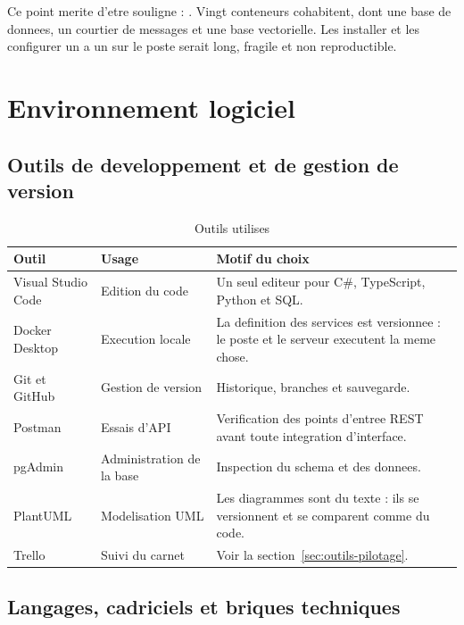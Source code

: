 Ce point merite d'etre souligne : . Vingt
conteneurs cohabitent, dont une base de donnees, un courtier de messages
et une base vectorielle. Les installer et les configurer un a un sur le
poste serait long, fragile et non reproductible.

\section{Environnement logiciel}

\subsection{Outils de developpement et de gestion de version}

\begin{table}[H]
\centering
\caption{Outils utilises}
\label{tab:outils}
\small
\begin{tabularx}{\textwidth}{@{}p{3.2cm}p{3.0cm}X@{}}
\toprule
\textbf{Outil} & \textbf{Usage} & \textbf{Motif du choix} \\ \midrule
Visual Studio Code & Edition du code &
  Un seul editeur pour C\#, TypeScript, Python et SQL. \\
Docker Desktop & Execution locale &
  La definition des services est versionnee : le poste et le serveur
  executent la meme chose. \\
Git et GitHub & Gestion de version &
  Historique, branches et sauvegarde. \\
Postman & Essais d'API &
  Verification des points d'entree REST avant toute integration
  d'interface. \\
pgAdmin & Administration de la base &
  Inspection du schema et des donnees. \\
PlantUML & Modelisation UML &
  Les diagrammes sont du texte : ils se versionnent et se comparent
  comme du code. \\
Trello & Suivi du carnet &
  Voir la section~\ref{sec:outils-pilotage}. \\
\bottomrule
\end{tabularx}
\end{table}

\subsection{Langages, cadriciels et briques techniques}

